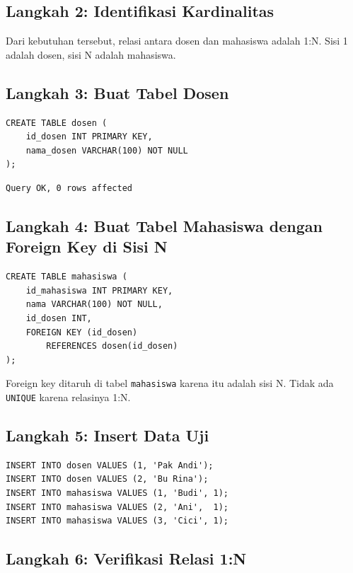 \documentclass[11pt,a4paper]{article}
\begin{document}
\subsection{Langkah 2: Identifikasi Kardinalitas}

Dari kebutuhan tersebut, relasi antara dosen dan mahasiswa adalah 1:N. Sisi 1 adalah dosen, sisi N adalah mahasiswa.

\subsection{Langkah 3: Buat Tabel Dosen}

\begin{lstlisting}[style=code]
CREATE TABLE dosen (
    id_dosen INT PRIMARY KEY,
    nama_dosen VARCHAR(100) NOT NULL
);
\end{lstlisting}

\begin{lstlisting}[style=out]
Query OK, 0 rows affected
\end{lstlisting}

\subsection{Langkah 4: Buat Tabel Mahasiswa dengan Foreign Key di Sisi N}

\begin{lstlisting}[style=code]
CREATE TABLE mahasiswa (
    id_mahasiswa INT PRIMARY KEY,
    nama VARCHAR(100) NOT NULL,
    id_dosen INT,
    FOREIGN KEY (id_dosen)
        REFERENCES dosen(id_dosen)
);
\end{lstlisting}

Foreign key ditaruh di tabel \texttt{mahasiswa} karena itu adalah sisi N. Tidak ada \texttt{UNIQUE} karena relasinya 1:N.

\subsection{Langkah 5: Insert Data Uji}

\begin{lstlisting}[style=code]
INSERT INTO dosen VALUES (1, 'Pak Andi');
INSERT INTO dosen VALUES (2, 'Bu Rina');
INSERT INTO mahasiswa VALUES (1, 'Budi', 1);
INSERT INTO mahasiswa VALUES (2, 'Ani',  1);
INSERT INTO mahasiswa VALUES (3, 'Cici', 1);
\end{lstlisting}

\subsection{Langkah 6: Verifikasi Relasi 1:N}
\end{document}

